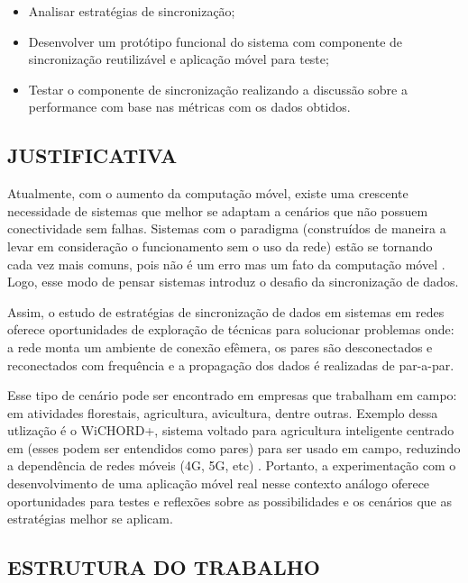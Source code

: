 \begin{itemize}[leftmargin=1.5cm]
  \item Analisar estratégias de sincronização;
  \item Desenvolver um protótipo funcional do sistema com componente de sincronização reutilizável e aplicação móvel para teste; 
  \item Testar o componente de sincronização realizando a discussão sobre a performance com base nas métricas com os dados obtidos.
\end{itemize}

\subsection{JUSTIFICATIVA}

Atualmente, com o aumento da computação móvel, existe uma crescente necessidade de sistemas que melhor se adaptam a cenários que não possuem conectividade sem falhas. Sistemas com o paradigma  (construídos de maneira a levar em consideração o funcionamento sem o uso da rede) estão se tornando cada vez mais comuns, pois  não é um erro mas um fato da computação móvel \cite{feyerke2021offlinefirst}. Logo, esse modo de pensar sistemas introduz o desafio da sincronização de dados.

Assim, o estudo de estratégias de sincronização de dados em sistemas  em redes  oferece oportunidades de exploração de técnicas para solucionar problemas onde: a rede  monta um ambiente de conexão efêmera, os pares são desconectados e reconectados com frequência e a propagação dos dados é realizadas de par-a-par.   

Esse tipo de cenário pode ser encontrado em empresas que trabalham em campo: em atividades florestais, agricultura, avicultura, dentre outras. Exemplo dessa utlização é o WiCHORD+, sistema voltado para agricultura inteligente centrado em  (esses podem ser entendidos como pares) para ser usado em campo, reduzindo a dependência de redes móveis (4G, 5G, etc) \cite{balatsouras2023wichord}. Portanto, a experimentação com o desenvolvimento de uma aplicação móvel real nesse contexto análogo oferece oportunidades para testes e reflexões sobre as possibilidades e os cenários que as estratégias melhor se aplicam.

\subsection{ESTRUTURA DO TRABALHO}


